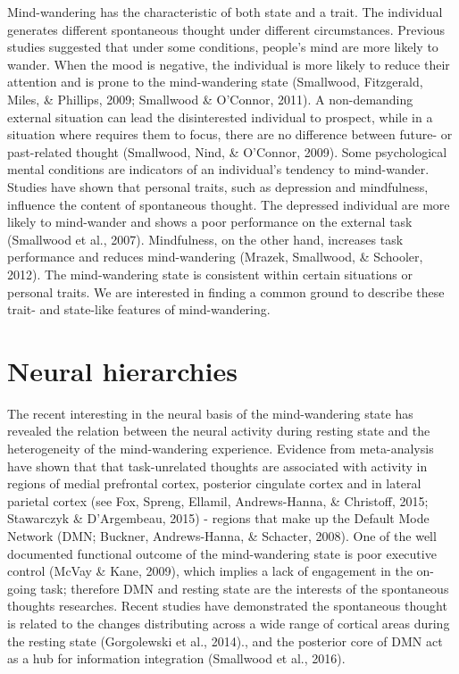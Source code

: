 Mind-wandering has the characteristic of both state and a trait. The individual generates different spontaneous thought under different circumstances. Previous studies suggested that under some conditions, people’s mind are more likely to wander. When the mood is negative, the individual is more likely to reduce their attention and is prone to the mind-wandering state (Smallwood, Fitzgerald, Miles, \& Phillips, 2009; Smallwood \& O’Connor, 2011). A non-demanding external situation can lead the disinterested individual to prospect, while in a situation where requires them to focus, there are no difference between future- or past-related thought (Smallwood, Nind, \& O’Connor, 2009). Some psychological mental conditions are indicators of an individual’s tendency to mind-wander.  Studies have shown that personal traits, such as depression and mindfulness, influence the content of spontaneous thought. The depressed individual are more likely to mind-wander and shows a poor performance on the external task (Smallwood et al., 2007). Mindfulness, on the other hand, increases task performance and reduces mind-wandering (Mrazek, Smallwood, \& Schooler, 2012). The mind-wandering state is consistent within certain situations or personal traits. We are interested in finding a common ground to describe these trait- and state-like features of mind-wandering.
\section{Neural hierarchies}
\label{intro:neural}
The recent interesting in the neural basis of the mind-wandering state has revealed the relation between the neural activity during resting state and the heterogeneity of the mind-wandering experience. Evidence from meta-analysis have shown that that task-unrelated thoughts are associated with activity in regions of medial prefrontal cortex, posterior cingulate cortex and in lateral parietal cortex (see Fox, Spreng, Ellamil, Andrews-Hanna, \& Christoff, 2015; Stawarczyk \& D’Argembeau, 2015) - regions that make up the Default Mode Network (DMN; Buckner, Andrews-Hanna, \& Schacter, 2008). One of the well documented functional outcome of the mind-wandering state is poor executive control (McVay \& Kane, 2009), which implies a lack of engagement in the on-going task; therefore DMN and resting state are the interests of the spontaneous thoughts researches. Recent studies have demonstrated the spontaneous thought is related to the changes distributing across a wide range of cortical areas during the resting state   (Gorgolewski et al., 2014)., and the posterior core of DMN act as a hub for information integration (Smallwood et al., 2016). 

